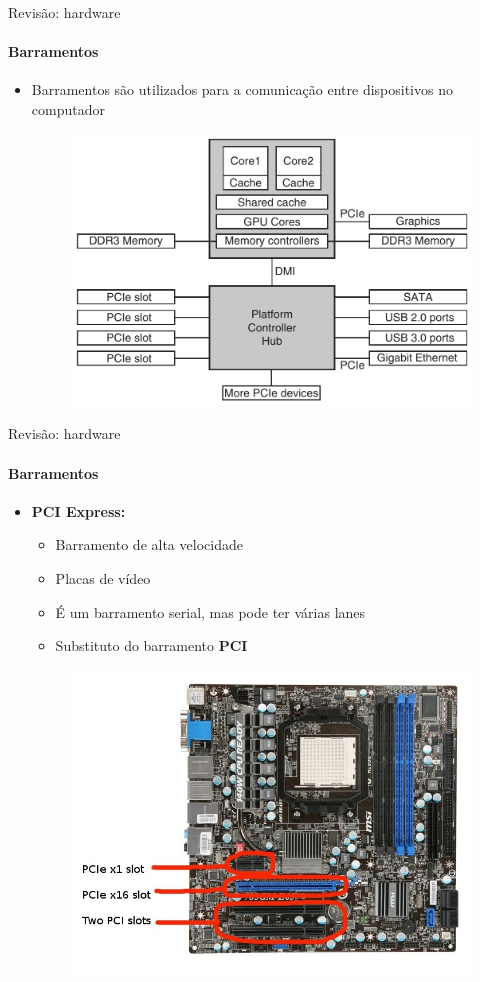 \documentclass{beamer}
\begin{document}
\begin{frame}{Revisão: hardware}
	\framesubtitle{Barramentos}
	\begin{itemize}
		\item Barramentos são utilizados para a comunicação entre dispositivos no computador
		\begin{figure}
			\includegraphics[width=0.6\paperwidth]{resources/buses}
		\end{figure}
	\end{itemize}
\end{frame}
\begin{frame}{Revisão: hardware}
	\framesubtitle{Barramentos}
	\begin{itemize}
		\item \textbf{PCI Express:}
		\begin{itemize}
			\item Barramento de alta velocidade
			\item Placas de vídeo
			\item É um barramento serial, mas pode ter várias \alert{lanes}
			\item Substituto do barramento \textbf{PCI}
		\end{itemize}
		\begin{figure}
			\includegraphics[width=0.5\paperwidth]{resources/pci}
		\end{figure}
	\end{itemize}
\end{frame}
\end{document}
